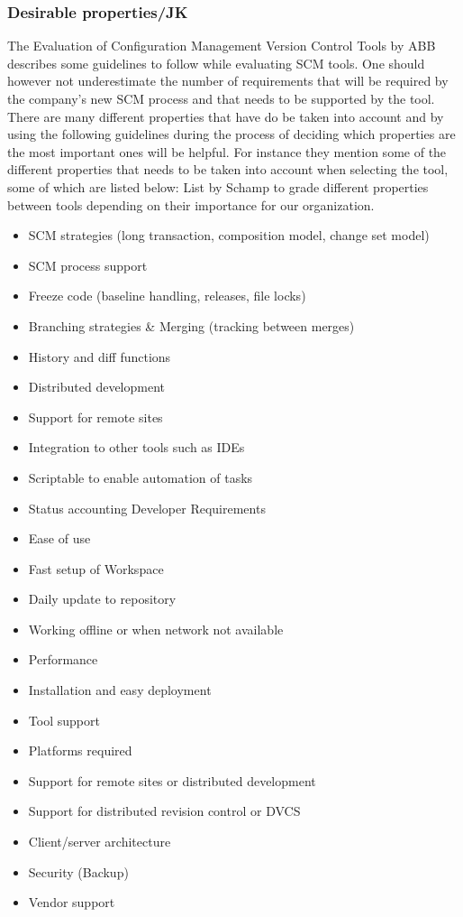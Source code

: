 \documentclass[10pt]{article}
\begin{document}
\subsubsection{Desirable properties/JK}
The Evaluation of Configuration Management Version Control Tools by ABB describes some guidelines to follow while evaluating SCM tools.
One should however not underestimate the number of requirements that will be required by the company's new SCM process and that needs to be supported by the tool.
There are many different properties that have do be taken into account and by using the following guidelines during the process of deciding which properties are the most important ones will be helpful. For instance they mention some of the different properties that needs to be taken into account when selecting the tool, some of which are listed below:
List by Schamp to grade different properties between tools depending on their importance for our organization.
\begin{itemize}
\item SCM strategies (long transaction, composition model, change set model)
\item SCM process support
\item Freeze code (baseline handling, releases, file locks)
\item Branching strategies \& Merging (tracking between merges)
\item History and diff functions
\item Distributed development
\item Support for remote sites
\item Integration to other tools such as IDEs
\item Scriptable to enable automation of tasks
\item Status accounting Developer Requirements
\item Ease of use
\item Fast setup of Workspace
\item Daily update to repository
\item Working offline or when network not available
\item Performance
\item Installation and easy deployment
\item Tool support
\item Platforms required
\item Support for remote sites or distributed development
\item Support for distributed revision control or DVCS
\item Client/server architecture
\item Security (Backup)
\item Vendor support
\end{itemize}
\end{document}
